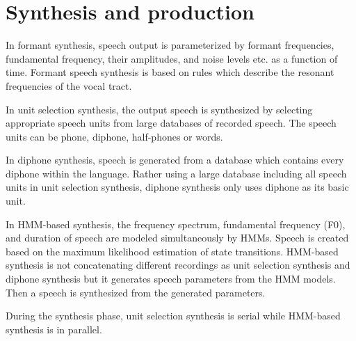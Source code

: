 \documentclass[12pt]{article}
\newenvironment{problem}[2][Problem]{\begin{trivlist}
\item[\hskip \labelsep {\bfseries #1}\hskip \labelsep {\bfseries #2.}]}{\end{trivlist}}
\begin{document}
\section{Synthesis and production}
\begin{problem}{2.1}
    In formant synthesis, speech output is parameterized by formant frequencies, 
    fundamental frequency, their amplitudes, and noise levels etc. as a function of time. 
    Formant speech synthesis is based on rules which describe the resonant frequencies 
    of the vocal tract. 
    
    In unit selection synthesis, the output speech is synthesized by selecting 
    appropriate speech units from large databases of recorded speech. 
    The speech units can be phone, diphone, half-phones or words. 
    
    In diphone synthesis, speech is generated from a database which contains every 
    diphone within the language. 
    Rather using a large database including all speech units in unit selection 
    synthesis, diphone synthesis only uses diphone as its basic unit. 
    
    In HMM-based synthesis, the frequency spectrum, fundamental frequency (F0), 
    and duration of speech are modeled simultaneously by HMMs. 
    Speech is created based on the maximum likelihood estimation of state transitions. 
    HMM-based synthesis is not concatenating different recordings 
    as unit selection synthesis and diphone synthesis but it generates speech parameters 
    from the HMM models. 
    Then a speech is synthesized from the generated parameters. 
    
    During the synthesis phase, unit selection synthesis is serial while 
    HMM-based synthesis is in parallel.
\end{problem}
\end{document}
